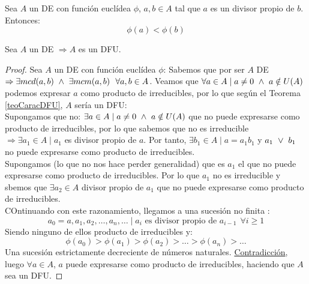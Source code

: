 \begin{lema}
    Sea $A$ un DE con función euclídea $\phi$, $a,b \in A$ tal que $a$ es un divisor propio de $b$. Entonces:
    $$\phi(a) < \phi(b)$$
\end{lema}

\begin{teo}
    \label{teoDEEntoncesDFU}
    Sea $A$ un DE $\Rightarrow A$ es un DFU.
\begin{proof}
    Sea $A$ un DE con función euclídea $\phi$:\newline
    Sabemos que por ser $A$ DE $\Rightarrow \exists mcd(a,b) \ \land \  \exists mcm(a,b)~~\forall a,b \in A$.\newline
    Veamos que $\forall a \in A \mid a \neq 0 \ \land \  a \notin U(A)$ podemos expresar $a$ como producto de irreducibles, por lo
    que según el Teorema \ref{teoCaracDFU}, $A$ sería un DFU:\\

    
    Supongamos que no: $\exists a \in A \mid a\neq 0 \ \land \  a \notin U(A)$ que no puede expresarse como producto de irreducibles,
    por lo que sabemos que no es irreducible $\Rightarrow \exists a_1 \in A \mid a_1$ es divisor propio de $a$.\newline
    Por tanto, $\exists b_1 \in A \mid a=a_1b_1$ y $a_1 \ \lor \  b_1$ no puede expresarse como producto de irreducibles.\\

    
    Supongamos (lo que no nos hace perder generalidad) que es $a_1$ el que no puede expresarse como producto de irreducibles.
    Por lo que $a_1$ no es irreducible y sbemos que $\exists a_2 \in A$ divisor propio de $a_1$ que no puede expresarse como
    producto de irreducibles.\\

    
    COntinuando con este razonamiento, llegamos a una sucesión no finita :
    $$a_0 = a, a_1, a_2, \ldots, a_n, \ldots \mid a_i \mbox{ es divisor propio de } a_{i-1}~~\forall i \geq 1$$
    Siendo ninguno de ellos producto de irreducibles y:
    $$\phi(a_0) > \phi(a_1) > \phi(a_2) > \ldots > \phi(a_n) > \ldots$$
    Una sucesión estrictamente decreciente de números naturales. \underline{Contradicción}, luego $\forall a \in A$, $a$
    puede expresarse como producto de irreducibles, haciendo que $A$ sea un DFU.
\end{proof}
\end{teo}

